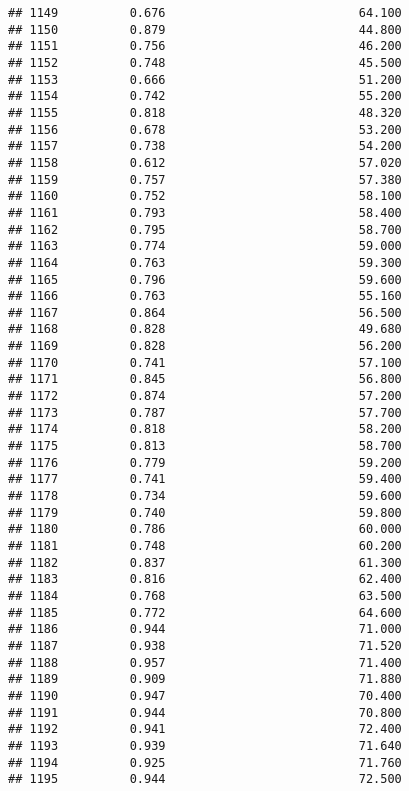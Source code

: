 \documentclass[
]{article}
\begin{document}
\begin{verbatim}
## 1149          0.676                           64.100
## 1150          0.879                           44.800
## 1151          0.756                           46.200
## 1152          0.748                           45.500
## 1153          0.666                           51.200
## 1154          0.742                           55.200
## 1155          0.818                           48.320
## 1156          0.678                           53.200
## 1157          0.738                           54.200
## 1158          0.612                           57.020
## 1159          0.757                           57.380
## 1160          0.752                           58.100
## 1161          0.793                           58.400
## 1162          0.795                           58.700
## 1163          0.774                           59.000
## 1164          0.763                           59.300
## 1165          0.796                           59.600
## 1166          0.763                           55.160
## 1167          0.864                           56.500
## 1168          0.828                           49.680
## 1169          0.828                           56.200
## 1170          0.741                           57.100
## 1171          0.845                           56.800
## 1172          0.874                           57.200
## 1173          0.787                           57.700
## 1174          0.818                           58.200
## 1175          0.813                           58.700
## 1176          0.779                           59.200
## 1177          0.741                           59.400
## 1178          0.734                           59.600
## 1179          0.740                           59.800
## 1180          0.786                           60.000
## 1181          0.748                           60.200
## 1182          0.837                           61.300
## 1183          0.816                           62.400
## 1184          0.768                           63.500
## 1185          0.772                           64.600
## 1186          0.944                           71.000
## 1187          0.938                           71.520
## 1188          0.957                           71.400
## 1189          0.909                           71.880
## 1190          0.947                           70.400
## 1191          0.944                           70.800
## 1192          0.941                           72.400
## 1193          0.939                           71.640
## 1194          0.925                           71.760
## 1195          0.944                           72.500

\end{verbatim}
\end{document}
